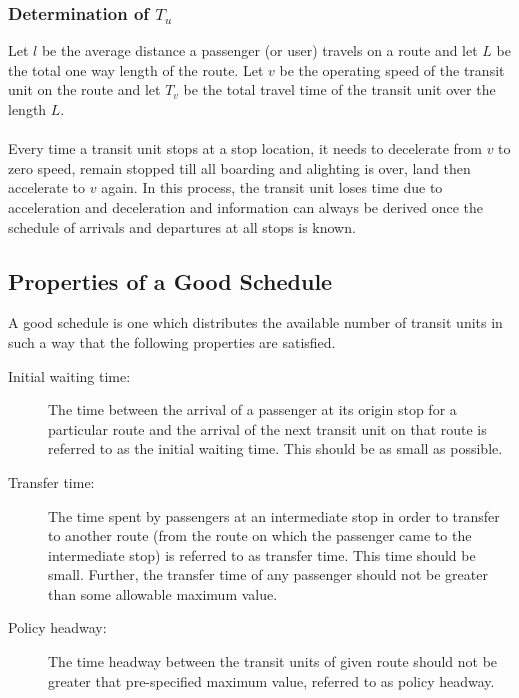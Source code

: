 \subsubsection{Determination of $T_u$}
Let $l$ be the average distance a passenger (or user) travels on a route and let $L$ be the total one way length of the route. Let $v$ be the operating speed of the transit unit on the route and let $T_v$ be the total travel time of the transit unit over the length $L$.\\\\
Every time a transit unit stops at a stop location, it needs to decelerate from $v$ to zero speed, remain stopped till all boarding and alighting is over, land then accelerate to $v$ again. In this process, the transit unit loses time due to acceleration and deceleration and information can always be derived once the schedule of arrivals and departures at all stops is known. 
\subsection{Properties of a Good Schedule}
A good schedule is one which distributes the available number of transit units in such a way that the following properties are satisfied.
\begin{description}
	\item [Initial waiting time:] The time between the arrival of a passenger at its origin stop for a particular route and the arrival of the next transit unit on that route is referred to as the initial waiting time. This should be as small as possible.
	\item [Transfer time:] The time spent by passengers at an intermediate stop in order to transfer to another route (from the route on which the passenger came to the intermediate stop) is referred to as transfer time. This time should be small. Further, the transfer time of any passenger should not be greater than some allowable maximum value.
	\item [Policy headway:] The time headway between the transit units of given route should not be greater that pre-specified maximum value, referred to as policy headway.
\end{description}
%
